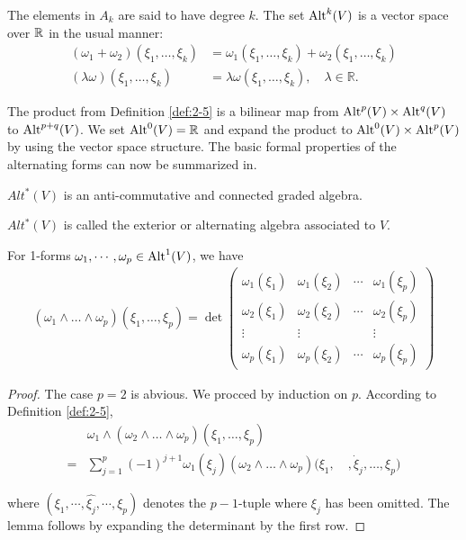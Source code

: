 The elements in $A_k$ are said to have degree $k$. The set $\operatorname{Alt}^k(V)$ is a vector space
over $\mathbb{R}$ in the usual manner:
\begin{align*}
  (\omega_1+\omega_2)(\xi_1,\dots,\xi_k) & = \omega_1(\xi_1,\dots,\xi_k)+\omega_2(\xi_1,\dots,\xi_k)\\
  (\lambda\omega)(\xi_1,\dots,\xi_k)     & = \lambda\omega(\xi_1,\dots,\xi_k),\quad\lambda\in\mathbb{R}. 
\end{align*}


The product from Definition \ref{def:2-5} is a bilinear map from $\operatorname{Alt}^p(V)\times\operatorname{Alt}^q(V)$ to 
$\operatorname{Alt}^{p+q}(V)$. We set $\operatorname{Alt}^0(V)=\mathbb{R}$ and expand the product to $\operatorname{Alt}^0(V)\times\operatorname{Alt}^p(V)$ by
using the vector space structure. The basic formal properties of the alternating forms can now be 
summarized in. 


\begin{theorem}\label{thm:2-12}
  $Alt^*(V)$ is an anti-commutative and connected graded algebra.
\end{theorem}

$Alt^*(V)$ is called the exterior or alternating algebra associated to $V$.


\begin{lemma}\label{lemma:2-13}
  For 1-forms $\omega_1, \cdots, \omega_p\in\operatorname{Alt}^1(V)$, we have 
  \begin{align*}
    (\omega_1\wedge\dots\wedge\omega_p)(\xi_1,\dots,\xi_p)
    = \det
    \begin{pmatrix}
      \omega_1(\xi_1) & \omega_1(\xi_2) & \cdots & \omega_1(\xi_p)\\
      \omega_2(\xi_1) & \omega_2(\xi_2) & \cdots & \omega_2(\xi_p)\\
      \vdots          & \vdots          &        & \vdots\\
      \omega_p(\xi_1) & \omega_p(\xi_2) & \cdots & \omega_p(\xi_p)
    \end{pmatrix}
  \end{align*}
\end{lemma}

\begin{proof}
  The case $p=2$ is abvious. We procced by induction on $p$. According to Definition \ref{def:2-5},
  \begin{align*}
      & \omega_{1}\wedge(\omega_{2}\wedge\ldots\wedge\omega_{p})(\xi_{1},\ldots,\xi_{p})\\
    = & \sum_{j=1}^{p}(-1)^{j+1}\omega_{1}(\xi_{j})(\omega_{2}\wedge\ldots\wedge\omega_{p})
      \Big(\xi_{1},\quad,\dot{\xi}_{j},\ldots,\xi_{p}\Big)
  \end{align*}

  where $(\xi_1, \cdots, \hat{\xi_j}, \cdots, \xi_p)$ denotes the $p-1$-tuple where 
  $\xi_j$ has been omitted. The lemma follows by expanding the determinant by the first row.
\end{proof}


